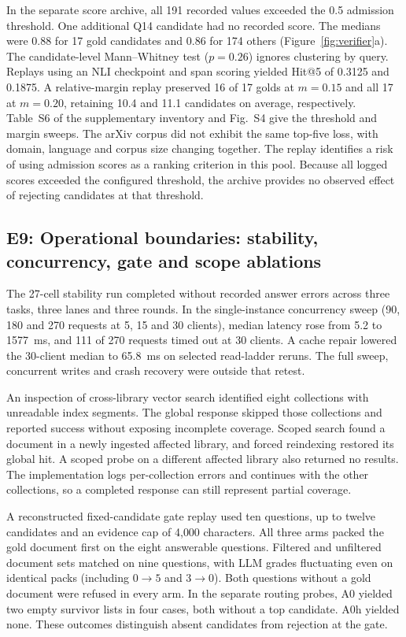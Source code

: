 In the separate score archive, all 191 recorded values exceeded the
0.5 admission threshold. One additional Q14 candidate had no recorded
score. The medians were 0.88 for 17 gold candidates and 0.86 for 174
others (Figure~\ref{fig:verifier}a). The candidate-level Mann--Whitney
test ($p=0.26$) ignores clustering by query. Replays using an NLI
checkpoint and span scoring yielded Hit@5 of 0.3125 and 0.1875. A
relative-margin replay preserved 16 of 17 golds at $m=0.15$ and all 17
at $m=0.20$, retaining 10.4 and 11.1 candidates on average, respectively.
Table~S6 of the supplementary inventory and Fig.~S4 give the threshold
and margin sweeps. The arXiv corpus did not exhibit the same top-five
loss, with domain, language and corpus size changing together. The
replay identifies a risk of using admission scores as a ranking
criterion in this pool. Because all logged scores exceeded the configured
threshold, the archive provides no observed effect of rejecting
candidates at that threshold.

\subsection{E9: Operational boundaries: stability, concurrency, gate and
scope ablations}
\label{sec:e7}
The 27-cell stability run completed without recorded answer errors
across three tasks, three lanes and three rounds. In the single-instance
concurrency sweep (90, 180 and 270 requests at 5, 15 and 30 clients),
median latency rose from 5.2 to 1577~ms, and 111 of 270 requests timed
out at 30 clients. A cache repair lowered the 30-client median to
65.8~ms on selected read-ladder reruns. The full sweep, concurrent writes
and crash recovery were outside that retest.

An inspection of cross-library vector search identified eight collections
with unreadable index segments. The global response skipped those
collections and reported success without exposing incomplete coverage.
Scoped search found a document in a newly ingested affected library,
and forced reindexing restored its global hit. A scoped probe on a
different affected library also returned no results. The implementation
logs per-collection errors and continues with the other collections, so
a completed response can still represent partial coverage.

A reconstructed fixed-candidate gate replay used ten questions, up to twelve
candidates and an evidence cap of 4{,}000 characters. All three arms
packed the gold document first on the eight answerable questions.
Filtered and unfiltered document sets matched on nine questions, with
LLM grades fluctuating even on identical packs (including $0\to5$ and
$3\to0$). Both questions without a gold document were refused in every
arm. In the separate routing probes, A0 yielded two empty survivor
lists in four cases, both without a top candidate. A0h yielded none.
These outcomes distinguish absent candidates from rejection at the gate.

